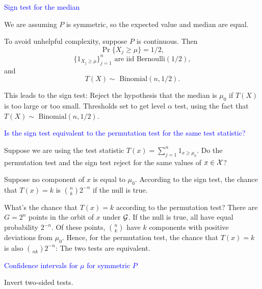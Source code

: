 \documentclass[landscape]{slides}
\newcommand{\cG}{{\cal G}}
\newcommand{\cX}{{\cal X}}
\newcommand{\beq}{\begin{equation}}
\newcommand{\eeq}{\end{equation}}
\newcommand{\Binomial}{{\mbox{ Binomial}}}
\begin{document}
\begin{slide}
{\textcolor{blue}{Sign test for the median}}

We are assuming $P$ is symmetric, so the expected value and median are equal.

To avoid unhelpful complexity, suppose $P$ is continuous.
Then 
\beq
   \Pr \{ X_j \ge \mu \} = 1/2, 
\eeq
\beq
   \{ 1_{X_j \ge \mu} \}_{j=1}^n \mbox{ are iid Bernoulli}(1/2),
\eeq
and 
\beq
    T(X) \sim \Binomial(n, 1/2).
\eeq

This leads to the sign test:  Reject the hypothesis that the median is $\mu_0$
if $T(X)$ is too large or too small.
Thresholds set to get level $\alpha$ test, using the fact that $T(X)\sim \Binomial(n, 1/2)$.

\end{slide}

\begin{slide}
{\textcolor{blue}{Is the sign test equivalent to the permutation test for the same test statistic?}}

Suppose we are using the test statistic $T(x) = \sum_{j=1}^n 1_{x \ge \mu_0}$.
Do the permutation test and the sign test reject for the same values of $x \in \cX$?

Suppose no component of $x$ is equal to $\mu_0$.
According to the sign test, the chance that $T(x) = k$ is
${{n}\choose{k}} 2^{-n}$ if the null is true.

What's the chance that $T(x) = k$ according to the permutation test?
There are $G = 2^n$ points in the orbit of $x$ under $\cG$.
If the null is true, all have equal probability $2^{-n}$.
Of these points, ${{n}\choose{k}}$ have $k$ components with positive deviations from $\mu_0$.
Hence, for the permutation test, the chance that $T(x) = k$ is also 
${\choose{n}{k}} 2^{-n}$:  The two tests are equivalent.
\end{slide}


\begin{slide}
{\textcolor{blue}{Confidence intervals for $\mu$ for symmetric $P$}}

Invert two-sided tests.

\end{slide}
\end{document}
